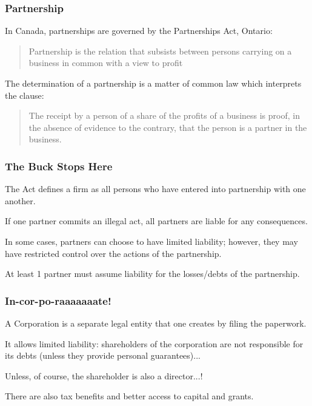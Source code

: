 \begin{frame}
\frametitle{Partnership}

In Canada, partnerships are governed by the Partnerships Act, Ontario:

\begin{quote}
Partnership is the relation that subsists between persons carrying on a business in common with a view to profit
\end{quote}

The determination of a partnership is a matter of common law which interprets the clause:

\begin{quote}
The receipt by a person of a share of the profits of a business
   is proof, in the absence of evidence to the contrary, that the
   person is a partner in the business.
\end{quote}

\end{frame}



\begin{frame}
\frametitle{The Buck Stops Here}

The Act defines a firm as all persons who have entered into partnership with one another.

If one partner commits an illegal act, all partners are liable for any consequences.

In some cases, partners can choose to have limited liability; however, they may have restricted control over the actions of the partnership.

At least 1 partner must assume liability for the losses/debts of the partnership.


\end{frame}



\begin{frame}
\frametitle{In-cor-po-raaaaaaate!}

A Corporation is a separate legal entity that one creates by filing the paperwork. 

It allows limited liability: shareholders of the corporation are not responsible for its debts (unless they provide personal guarantees)...

Unless, of course, the shareholder is also a director...!

There are also tax benefits and better access to capital and grants. 

\end{frame}



